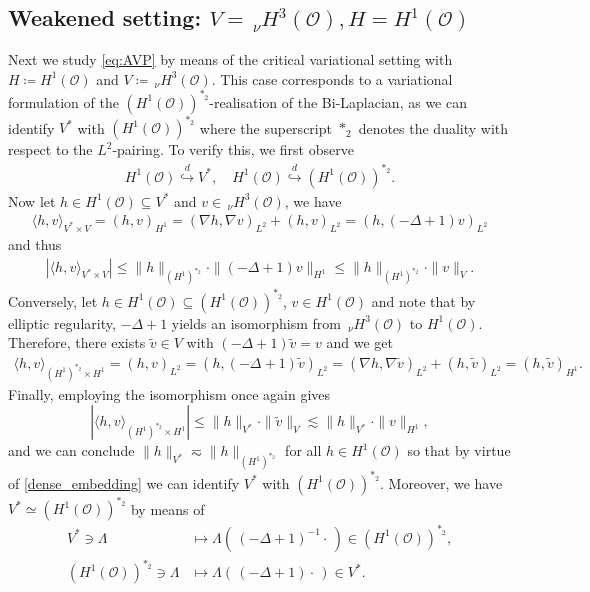 \documentclass[reqno]{amsart}
\newcommand{\sO}{\mathscr{O}}
\newcommand{\seq}{\subseteq}
\newcommand{\1}{\mathbf{1}}
\newcommand{\nH}{\ensuremath{\,_\nu H}}
\begin{document}
\subsection{Weakened setting: \texorpdfstring{$V= \nH^3(\sO), H=H^1(\sO)$}{\textit{V=HN3(O), H=H1(O)}}}\label{weakened_setting}

Next we study \eqref{eq:AVP} by means of the critical variational setting with $H\coloneq H^1(\sO)$ and $V\coloneq \nH^3(\sO)$. This case corresponds to a variational formulation of the $(H^1(\sO))^{\ast_2}$-realisation of the Bi-Laplacian, as we can identify $V^\ast $ with $(H^1(\sO))^{\ast_2}$ where the superscript $\ast_2$ denotes the duality with respect to the $L^2$-pairing. To verify this, we first observe
\begin{align}\label{dense_embedding}
 H^1(\sO)\overset{d}{\hookrightarrow} V^\ast, \quad  H^1(\sO)\overset{d}{\hookrightarrow} (H^1(\sO))^{\ast_2}.   
\end{align}   
Now let $h\in H^1(\sO) \seq V^\ast$ and $v\in \nH^3(\sO)$, we have
\begin{align*}
    \langle h , v\rangle_{V^\ast \times V}=( h , v)_{H^1}=( \nabla h , \nabla v )_{L^2} +( h ,v )_{L^2} =( h , (-\Delta+1) v )_{L^2} 
\end{align*}
and thus 
\begin{align*}
   | \langle h , v\rangle_{V^\ast \times V} | \leq \|h \|_{(H^1)^{\ast_2}} \cdot  \|  (-\Delta+1)v \|_{H^1} \leq \|h \|_{(H^1)^{\ast_2}} \cdot  \| v \|_{V}.
\end{align*}
Conversely, let $h\in H^1(\sO) \seq (H^1(\sO))^{\ast_2}$, $v\in H^1(\sO)$ and note that by elliptic regularity, $-\Delta+1$ yields an isomorphism from $\nH^3(\sO)$ to $ H^1(\sO)$. Therefore, there exists $\tilde{v}\in V$ with $(-\Delta+1)\tilde{v}=v$ and we get
\begin{align*}
    \langle h , v\rangle_{(H^1)^{\ast_2} \times  H^1}=( h,v )_{L^2}=( h, (-\Delta+1)\tilde{v}  )_{L^2}=( \nabla h , \nabla \tilde{v} )_{L^2} +( h ,\tilde{v} )_{L^2} = ( h, \tilde{v} )_{H^1}.
\end{align*}
Finally, employing the isomorphism once again gives 
\[ | \langle h , v\rangle_{(H^1)^{\ast_2} \times  H^1} | \leq \|h \|_{V^\ast}\cdot \| \tilde{v} \|_{V} \lesssim \|h \|_{V^\ast}\cdot \| v \|_{H^1},\]
and we can conclude $\| h\|_{V^\ast}\eqsim\|h \|_{(H^1)^{\ast_2}}$ for all $h\in H^1(\sO)$ so that by virtue of \eqref{dense_embedding} we can identify $V^\ast$
with $(H^1(\sO))^{\ast_2}$.
Moreover, we have $V^\ast \simeq (H^1(\sO))^{\ast_2}$ by means of
\begin{align}
\label{eq:dualIsomorphism}
   V^\ast \ni \Lambda &\mapsto \Lambda\left(\,(-\Delta+1)^{-1} \cdot\,\right) \in (H^1(\sO))^{\ast_2},\nonumber\\  
  (H^1(\sO))^{\ast_2} \ni \Lambda  &\mapsto \Lambda\left(\,(-\Delta+1) \cdot\,\right) \in V^\ast.
\end{align}
\end{document}

